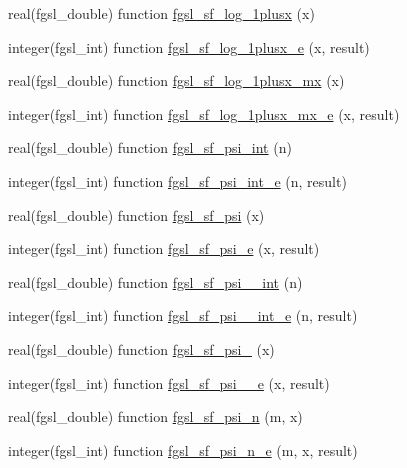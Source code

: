 \begin{DoxyCompactItemize}
\item 
real(fgsl\+\_\+double) function \hyperlink{specfunc_8finc_a33af9ff7d269f4f075be7fa05b56d292}{fgsl\+\_\+sf\+\_\+log\+\_\+1plusx} (x)
\item 
integer(fgsl\+\_\+int) function \hyperlink{specfunc_8finc_a19fdda460dd1ff4a4e95e9e5a50eaa33}{fgsl\+\_\+sf\+\_\+log\+\_\+1plusx\+\_\+e} (x, result)
\item 
real(fgsl\+\_\+double) function \hyperlink{specfunc_8finc_a053c501251b69c88d8f66d602bccd6c2}{fgsl\+\_\+sf\+\_\+log\+\_\+1plusx\+\_\+mx} (x)
\item 
integer(fgsl\+\_\+int) function \hyperlink{specfunc_8finc_aa37478c65e0ec41374adacdbaff2756e}{fgsl\+\_\+sf\+\_\+log\+\_\+1plusx\+\_\+mx\+\_\+e} (x, result)
\item 
real(fgsl\+\_\+double) function \hyperlink{specfunc_8finc_ab3c88437981ec1773582b6268cb4ac73}{fgsl\+\_\+sf\+\_\+psi\+\_\+int} (n)
\item 
integer(fgsl\+\_\+int) function \hyperlink{specfunc_8finc_a11370016efa890eccd3ad164f2c7d5fe}{fgsl\+\_\+sf\+\_\+psi\+\_\+int\+\_\+e} (n, result)
\item 
real(fgsl\+\_\+double) function \hyperlink{specfunc_8finc_ae2ad3b35d7a4796bafff5acea65b806c}{fgsl\+\_\+sf\+\_\+psi} (x)
\item 
integer(fgsl\+\_\+int) function \hyperlink{specfunc_8finc_abaab30a9208765ca24711fcb5535e566}{fgsl\+\_\+sf\+\_\+psi\+\_\+e} (x, result)
\item 
real(fgsl\+\_\+double) function \hyperlink{specfunc_8finc_afc36a0cecadb24ae6cf4fa19d8e648e1}{fgsl\+\_\+sf\+\_\+psi\+\_\+\_\+int} (n)
\item 
integer(fgsl\+\_\+int) function \hyperlink{specfunc_8finc_a5dc442d40bcd780c8796587f326ad84a}{fgsl\+\_\+sf\+\_\+psi\+\_\+\_\+int\+\_\+e} (n, result)
\item 
real(fgsl\+\_\+double) function \hyperlink{specfunc_8finc_aec74f69cd3f70ff1b47f8c936a0d2d52}{fgsl\+\_\+sf\+\_\+psi\+\_} (x)
\item 
integer(fgsl\+\_\+int) function \hyperlink{specfunc_8finc_a80fe4950516eda1ff1e15fb928cc29d6}{fgsl\+\_\+sf\+\_\+psi\+\_\+\_\+e} (x, result)
\item 
real(fgsl\+\_\+double) function \hyperlink{specfunc_8finc_a80562cfacb64fb925a3c7ce5ec91d7c4}{fgsl\+\_\+sf\+\_\+psi\+\_\+n} (m, x)
\item 
integer(fgsl\+\_\+int) function \hyperlink{specfunc_8finc_a3ddb539ba9d0c948be7666ac805f333c}{fgsl\+\_\+sf\+\_\+psi\+\_\+n\+\_\+e} (m, x, result)
\item 

\end{DoxyCompactItemize}
